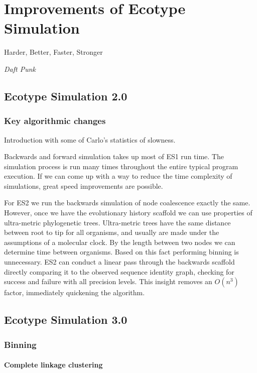 \chapter{Improvements of Ecotype Simulation}

\begin{shadequote}
Harder, Better, Faster, Stronger \par\emph{Daft Punk}
\end{shadequote}


\section{Ecotype Simulation 2.0}
\subsection*{Key algorithmic changes}
Introduction with some of Carlo's statistics of slowness.

Backwards and forward simulation takes up most of ES1 run time.
The simulation process is run many times throughout the entire typical program execution.
If we can come up with a way to reduce the time complexity of simulations, great speed improvements are possible.

For ES2 we run the backwards simulation of node coalescence exactly the same.
However, once we have the evolutionary history scaffold we can use properties of ultra-metric phylogenetic trees.
Ultra-metric trees have the same distance between root to tip for all organisms, and usually are made under the assumptions of a molecular clock.
By the length between two nodes we can determine time between organisms.
Based on this fact performing binning is unnecessary.
ES2 can conduct a linear pass through the backwards scaffold directly comparing it to the observed sequence identity graph, checking for success and failure with all precision levels.
This insight removes an $O(n^3)$ factor, immediately quickening the algorithm.



\section{Ecotype Simulation 3.0}
\subsection*{Binning}
\subsubsection*{Complete linkage clustering}
